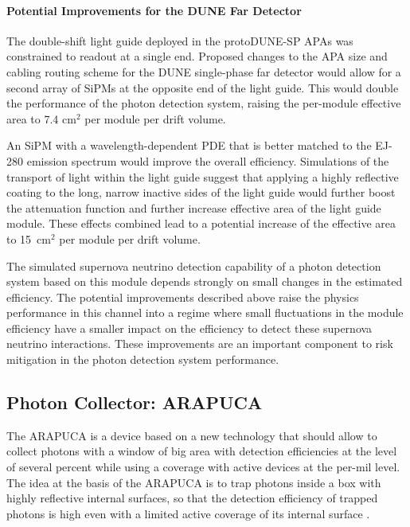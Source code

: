 \paragraph*{Potential Improvements for the DUNE Far Detector}

The double-shift light guide deployed in the protoDUNE-SP APAs was constrained 
to readout at a single end. Proposed changes to the APA size and cabling routing 
scheme for the DUNE single-phase far detector would allow for a second array of 
SiPMs at the opposite end of the light guide. This would double the performance of
 the photon detection system, raising the per-module effective area to 7.4 cm$^{2}$ 
per module per drift volume.

An SiPM with a wavelength-dependent PDE that is better matched to the EJ-280 emission 
spectrum would improve the overall efficiency. Simulations of the transport of light 
within the light guide suggest that applying a highly reflective coating to the long, 
narrow inactive sides of the light guide would further boost the attenuation function
 and further increase effective area of the light guide module. These effects combined 
lead to a potential increase of the effective area to 15~cm$^{2}$ per module per drift volume.

The simulated supernova neutrino detection capability of a photon detection system 
based on this module depends strongly on small changes in the estimated efficiency.
 The potential improvements described above raise the physics performance in this 
channel into a regime where small fluctuations in the module efficiency have a 
smaller impact on the efficiency to detect these supernova neutrino interactions. 
These improvements are an important component to risk mitigation in the photon 
detection system performance.


\subsection{Photon Collector: ARAPUCA}
\label{ssec:fdsp-pd-pc-arapuca}


The ARAPUCA is a device based on a new technology that should allow to collect photons with a window of big area with detection efficiencies at the level of several percent while using a coverage with active devices at the per-mil level.
The idea at the basis of the ARAPUCA is to trap photons inside a box with highly reflective internal surfaces, so that the detection efficiency of trapped photons is high even with a 
limited active coverage of its internal surface \cite{arapuca_jinst}.

